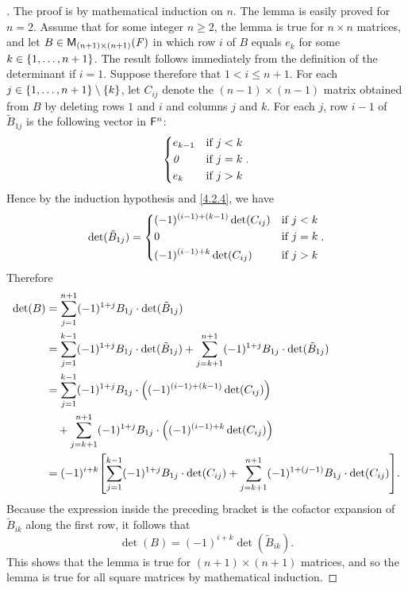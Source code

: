 \begin{proof}[]
  The proof is by mathematical induction on \(n\).
  The lemma is easily proved for \(n = 2\).
  Assume that for some integer \(n \geq 2\), the lemma is true for \(n \times n\) matrices, and let \(B \in \ms[(n + 1)][(n + 1)][\F]\) in which row \(i\) of \(B\) equals \(e_k\) for some \(k \in \left\lbrace1, \dots, n + 1\right\rbrace\).
  The result follows immediately from the definition of the determinant if \(i = 1\).
  Suppose therefore that \(1 < i \leq n + 1\).
  For each \(j \in \left\lbrace1, \dots, n + 1\right\rbrace \setminus \left\lbrace k\right\rbrace\), let \(C_{i j}\) denote the \((n - 1) \times (n - 1)\) matrix obtained from \(B\) by deleting rows \(1\) and \(i\) and columns \(j\) and \(k\).
  For each \(j\), row \(i - 1\) of \(\tilde{B}_{1 j}\) is the following vector in \(\mathsf{F}^n\):
  \[
    \begin{dcases}
      e_{k - 1} & \text{if } j < k \\
      \mathit{0}       & \text{if } j = k \\
      e_k       & \text{if } j > k
    \end{dcases}.
  \]
  Hence by the induction hypothesis and \cref{4.2.4}, we have
  \[
    \det(\tilde{B}_{1 j}) = \begin{dcases}
      (-1)^{(i - 1) + (k - 1)} \det(C_{i j}) & \text{if } j < k \\
      0                                      & \text{if } j = k \\
      (-1)^{(i - 1) + k} \det(C_{i j})       & \text{if } j > k
    \end{dcases}.
  \]
  Therefore
  \begin{align*}
    \det(B) & = \sum_{j = 1}^{n + 1} (-1)^{1 + j} B_{1 j} \cdot \det(\tilde{B}_{1 j})                                                                                      \\
            & = \sum_{j = 1}^{k - 1} (-1)^{1 + j} B_{1 j} \cdot \det(\tilde{B}_{1 j}) + \sum_{j = k + 1}^{n + 1} (-1)^{1 + j} B_{1 j} \cdot \det(\tilde{B}_{1 j})          \\
            & = \sum_{j = 1}^{k - 1} (-1)^{1 + j} B_{1 j} \cdot \pa{(-1)^{(i - 1) + (k - 1)} \det(C_{i j})}                                                                \\
            & \quad + \sum_{j = k + 1}^{n + 1} (-1)^{1 + j} B_{1 j} \cdot \pa{(-1)^{(i - 1) + k} \det(C_{i j})}                                                            \\
            & = (-1)^{i + k} \br{\sum_{j = 1}^{k - 1} (-1)^{1 + j} B_{1 j} \cdot \det(C_{i j}) + \sum_{j = k + 1}^{n + 1} (-1)^{1 + (j - 1)} B_{1 j} \cdot \det(C_{i j})}.
  \end{align*}
  Because the expression inside the preceding bracket is the cofactor expansion of \(\tilde{B}_{i k}\) along the first row, it follows that
  \[
    \det(B) = (-1)^{i + k} \det(\tilde{B}_{i k}).
  \]
  This shows that the lemma is true for \((n + 1) \times (n + 1)\) matrices, and so the lemma is true for all square matrices by mathematical induction.
\end{proof}

